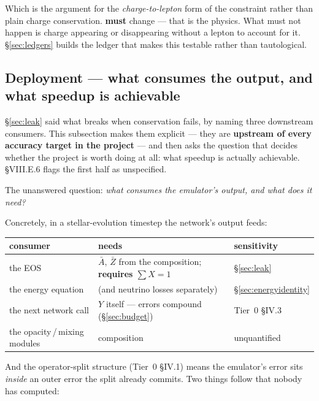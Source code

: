 Which is the argument for the \emph{charge-to-lepton} form of the constraint
rather than plain charge conservation. \Ye{} \textbf{must} change --- that is
the physics. What must not happen is charge appearing or disappearing without a
lepton to account for it. \S\ref{sec:ledgers} builds the ledger that makes this
testable rather than tautological.

\subsection{Deployment --- what consumes the output, and what speedup is
            achievable}
\label{sec:deployment}

\S\ref{sec:leak} said what breaks when conservation fails, by naming three
downstream consumers. This subsection makes them explicit --- they are
\textbf{upstream of every accuracy target in the project} --- and then asks the
question that decides whether the project is worth doing at all: what speedup is
actually achievable.  \S VIII.E.6 flags the first half as
unspecified.

The unanswered question: \emph{what consumes the emulator's output, and what
does it need?}

Concretely, in a stellar-evolution timestep the network's output feeds:

\begin{center}
\begin{tabularx}{\textwidth}{@{}L{4.0cm} Y L{2.6cm}@{}}
\toprule
\textbf{consumer} & \textbf{needs} & \textbf{sensitivity} \\
\midrule
the EOS & $\bar A$, $\bar Z$ from the composition;
  \textbf{requires $\sum X = 1$} & \S\ref{sec:leak} \\
the energy equation & \enuc{} (and neutrino losses separately) &
  \S\ref{sec:energyidentity} \\
the next network call & $Y$ itself --- errors compound
  (\S\ref{sec:budget}) & Tier~0 \S IV.3 \\
the opacity\,/\,mixing modules & composition & unquantified \\
\bottomrule
\end{tabularx}
\end{center}

And the operator-split structure (Tier~0 \S IV.1) means the emulator's error
sits \emph{inside} an outer error the split already commits. Two things follow
that nobody has computed:

